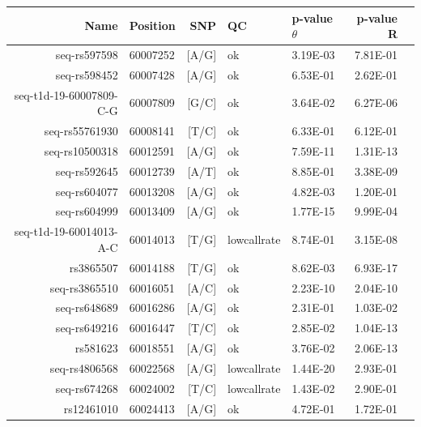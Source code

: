 \begin{table}[h]
\begin{center}
\footnotesize
\begin{tabular}{rlrllrr}
  \hline
Name                    & Position & SNP   & QC          & p-value $\theta$  & p-value R \\
  \hline
seq-rs597598            & 60007252 & [A/G] & ok          & 3.19E-03 & 7.81E-01 \\
seq-rs598452            & 60007428 & [A/G] & ok          & 6.53E-01 & 2.62E-01 \\
\rowcolor{LightCyan}
seq-t1d-19-60007809-C-G & 60007809 & [G/C] & ok          & 3.64E-02 & 6.27E-06 \\
seq-rs55761930          & 60008141 & [T/C] & ok          & 6.33E-01 & 6.12E-01 \\
\rowcolor{LightCyan}
seq-rs10500318          & 60012591 & [A/G] & ok          & 7.59E-11 & 1.31E-13 \\
\rowcolor{LightCyan}
seq-rs592645            & 60012739 & [A/T] & ok          & 8.85E-01 & 3.38E-09 \\
seq-rs604077            & 60013208 & [A/G] & ok          & 4.82E-03 & 1.20E-01 \\
\rowcolor{LightCyan}
seq-rs604999            & 60013409 & [A/G] & ok          & 1.77E-15 & 9.99E-04 \\
\rowcolor{LightCyan}
seq-t1d-19-60014013-A-C & 60014013 & [T/G] & lowcallrate & 8.74E-01 & 3.15E-08 \\
\rowcolor{LightCyan}
rs3865507               & 60014188 & [T/G] & ok          & 8.62E-03 & 6.93E-17 \\
\rowcolor{LightCyan}
seq-rs3865510           & 60016051 & [A/C] & ok          & 2.23E-10 & 2.04E-10 \\
seq-rs648689            & 60016286 & [A/G] & ok          & 2.31E-01 & 1.03E-02 \\
\rowcolor{LightCyan}
seq-rs649216            & 60016447 & [T/C] & ok          & 2.85E-02 & 1.04E-13 \\
\rowcolor{LightCyan}
rs581623                & 60018551 & [A/G] & ok          & 3.76E-02 & 2.06E-13 \\
\rowcolor{LightCyan}
seq-rs4806568           & 60022568 & [A/G] & lowcallrate & 1.44E-20 & 2.93E-01 \\
seq-rs674268            & 60024002 & [T/C] & lowcallrate & 1.43E-02 & 2.90E-01 \\
rs12461010              & 60024413 & [A/G] & ok          & 4.72E-01 & 1.72E-01 \\

\end{tabular}
\end{center}
\end{table}
